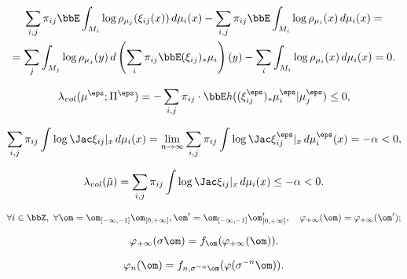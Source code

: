 \documentclass[a4paper,12pt]{article}
\begin{document}
\begin{multline}\label{e:lyap-corr}
\sum_{i,j} \pi_{ij} \bbE \int_{M_i} \log \rho_{\mu_j}(\xi_{ij}(x))\, d\mu_i(x)  -  \sum_{i,j} \pi_{ij} \bbE \int_{M_i} \log \rho_{\mu_i}(x) \,d\mu_i(x) = \\
=\sum_{j} \int_{M_j} \log \rho_{\mu_j}(y)\, d\left(\sum_i \pi_{ij} \bbE (\xi_{ij})_{*} \mu_i\right)(y)   -  \sum_{i} \int_{M_i} \log \rho_{\mu_i}(x) \,d\mu_i(x) = 0.
\end{multline}

$$
\lambda_{vol}(\mu^{\eps}; \Pi^{\eps})=-\sum_{i,j} \pi_{ij} \cdot \bbE h ((\xi_{ij}^{\eps})_* \mu^{\eps}_i | \mu^{\eps}_j) \le 0,
$$

$$
\sum_{i,j} \pi_{ij} \int \log \Jac \xi_{ij}|_x \, d\mu_i(x) = \lim_{n \to \infty} \sum_{i,j} \pi_{ij} \int \log \Jac \xi_{ij}^\eps|_x \, d\mu_i^\eps(x) = -\alpha < 0,
$$

$$
\lambda_{vol} (\tilde{\mu})= \sum_{i,j} \pi_{ij} \int \log \Jac \xi_{ij}|_x \, d\mu_i(x) \le -\alpha < 0.
$$

$$
\forall i \in \bbZ, \ \forall \om = \om_{[-\infty, -1]} \om_{[0, +\infty]}, \om' = \om_{[-\infty, -1]} \om_{[0, +\infty]}', \quad \varphi_{+\infty} (\om) = \varphi_{+\infty} (\om');
$$

$$
\varphi_{+\infty} (\sigma \om) = f_{\om} (\varphi_{+\infty} (\om)).
$$

$$
\varphi_n(\om) = f_{n, \sigma^{-n}\om} (\varphi (\sigma^{-n} \om)).
$$
\end{document}
